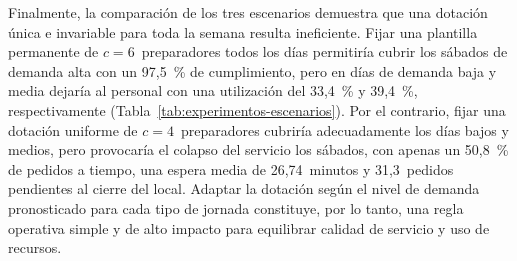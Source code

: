 Finalmente, la comparación de los tres escenarios demuestra que una dotación única e invariable para toda la semana resulta ineficiente.
Fijar una plantilla permanente de $c = 6$~preparadores todos los días permitiría cubrir los sábados de demanda alta con un 97,5~\% de cumplimiento, pero en días de demanda baja y media dejaría al personal con una utilización del 33,4~\% y 39,4~\%, respectivamente (Tabla~\ref{tab:experimentos-escenarios}).
Por el contrario, fijar una dotación uniforme de $c = 4$~preparadores cubriría adecuadamente los días bajos y medios, pero provocaría el colapso del servicio los sábados, con apenas un 50,8~\% de pedidos a tiempo, una espera media de 26,74~minutos y 31,3~pedidos pendientes al cierre del local.
Adaptar la dotación según el nivel de demanda pronosticado para cada tipo de jornada constituye, por lo tanto, una regla operativa simple y de alto impacto para equilibrar calidad de servicio y uso de recursos.
